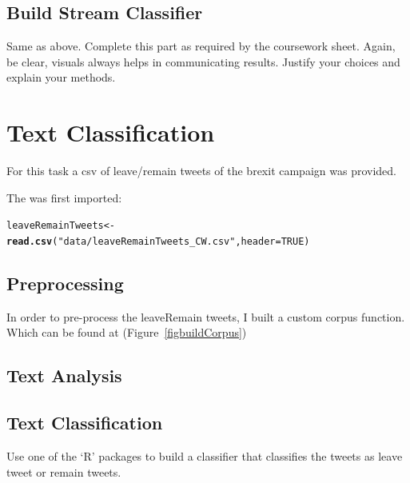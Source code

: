 \documentclass[10pt  ,usenames, dvipsnames]{article}\usepackage[]{graphicx}\usepackage[]{color}
\makeatletter
\newcommand{\hlnum}[1]{\textcolor[rgb]{0.686,0.059,0.569}{#1}}%
\newcommand{\hlstr}[1]{\textcolor[rgb]{0.192,0.494,0.8}{#1}}%
\newcommand{\hlstd}[1]{\textcolor[rgb]{0.345,0.345,0.345}{#1}}%
\newcommand{\hlkwb}[1]{\textcolor[rgb]{0.69,0.353,0.396}{#1}}%
\newcommand{\hlkwc}[1]{\textcolor[rgb]{0.333,0.667,0.333}{#1}}%
\newcommand{\hlkwd}[1]{\textcolor[rgb]{0.737,0.353,0.396}{\textbf{#1}}}%
\newenvironment{kframe}{%
 \def\at@end@of@kframe{}%
 \ifinner\ifhmode%
  \def\at@end@of@kframe{\end{minipage}}%
  \begin{minipage}{\columnwidth}%
 \fi\fi%
 \def\FrameCommand##1{\hskip\@totalleftmargin \hskip-\fboxsep
 \colorbox{shadecolor}{##1}\hskip-\fboxsep
     \hskip-\linewidth \hskip-\@totalleftmargin \hskip\columnwidth}%
 \MakeFramed {\advance\hsize-\width
   \@totalleftmargin\z@ \linewidth\hsize
   \@setminipage}}%
 {\par\unskip\endMakeFramed%
 \at@end@of@kframe}
\newenvironment{knitrout}{}{} %
\makeatother
\begin{document}
\clearpage

\subsection{Build Stream Classifier}

Same as above. Complete this part as required by the coursework sheet. Again, be clear, visuals always helps in communicating results. Justify your choices and explain your methods. 


\clearpage

\section {Text Classification}
For this task a csv of leave/remain tweets of the brexit campaign was provided.

The was first imported:
\begin{knitrout}
\color{fgcolor}\begin{kframe}
\begin{alltt}
\hlstd{leaveRemainTweets} \hlkwb{<-} \hlkwd{read.csv}\hlstd{(}\hlstr{"data/leaveRemainTweets_CW.csv"}\hlstd{,} \hlkwc{header}\hlstd{=}\hlnum{TRUE}\hlstd{)}
\end{alltt}
\end{kframe}
\end{knitrout}

\subsection{Preprocessing}

In order to pre-process the leaveRemain tweets, I built a custom corpus function. Which can be found at (Figure~\ref{figbuildCorpus})


\clearpage

\subsection{Text Analysis}



\clearpage

\subsection{Text Classification}

Use one of the ‘R’ packages to build a classifier that classifies the tweets as leave tweet or remain tweets. 
\end{document}
